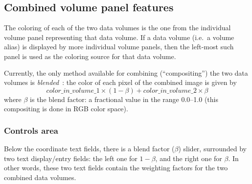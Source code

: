 \subsection{Combined volume panel features}
\label{sec:combined-panel-features}
The coloring of each of the two data volumes is the one from the
individual volume panel representing that data volume. If a data
volume (i.e.\ a volume alias) is displayed by more individual volume
panels, then the left-most such panel is used as the coloring source
for that data volume.

Currently, the only method available for combining (``compositing'')
the two data volumes is {\em blended}\ : the color of each pixel of
the combined image is given by
\[ color\_in\_volume\_1 \times ( 1 - \beta ) + 
color\_in\_volume\_2 \times \beta \] where $\beta$ is the blend
factor: a fractional value in the range 0.0--1.0 (this compositing is
done in RGB color space).

\subsubsection{Controls area}
Below the coordinate text fields, there is a blend factor ($\beta$)
slider, surrounded by two text display/entry fields: the left one for
$1 - \beta$, and the right one for $\beta$.  In other words, these two
text fields contain the weighting factors for the two combined data
volumes.


